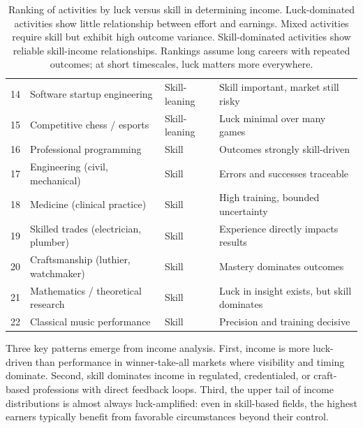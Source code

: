 \begin{table}[H]
\begin{tabular}{clll}
    14                     & Software startup engineering          & Skill-leaning            & Skill important, market still risky         \\
    15                     & Competitive chess / esports           & Skill-leaning            & Luck minimal over many games                \\
    16                     & Professional programming              & Skill                    & Outcomes strongly skill-driven              \\
    17                     & Engineering (civil, mechanical)       & Skill                    & Errors and successes traceable              \\
    18                     & Medicine (clinical practice)          & Skill                    & High training, bounded uncertainty          \\
    19                     & Skilled trades (electrician, plumber) & Skill                    & Experience directly impacts results         \\
    20                     & Craftsmanship (luthier, watchmaker)   & Skill                    & Mastery dominates outcomes                  \\
    21                     & Mathematics / theoretical research    & Skill                    & Luck in insight exists, but skill dominates \\
    22                     & Classical music performance           & Skill                    & Precision and training decisive             \\
    \bottomrule
  \end{tabular}
  \caption{Ranking of activities by luck versus skill in determining
  income. Luck-dominated activities show little relationship between effort
  and earnings. Mixed activities require skill but exhibit high outcome
  variance. Skill-dominated activities show reliable skill-income relationships.
  Rankings assume long careers with repeated outcomes; at short timescales,
  luck matters more everywhere.}
  \label{tab:income_rankings}
\end{table}

Three key patterns emerge from income analysis. First, income is more luck-driven
than performance in winner-take-all markets where visibility and timing dominate.
Second, skill dominates income in regulated, credentialed, or craft-based
professions with direct feedback loops. Third, the upper tail of income distributions
is almost always luck-amplified: even in skill-based fields, the highest
earners typically benefit from favorable circumstances beyond their control.

